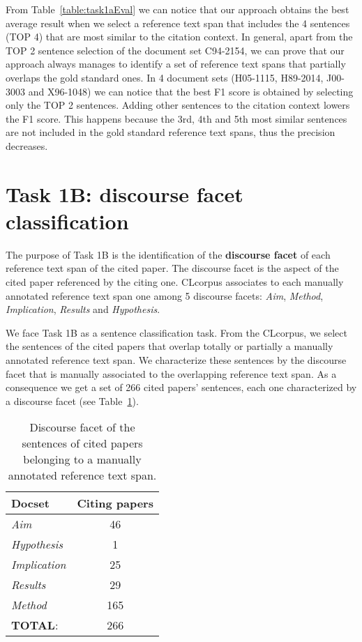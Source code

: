 \documentclass[11pt]{article}
\begin{document}
From Table~\ref{table:task1aEval} we can notice that our approach obtains the best average result when we select a reference text span that includes the 4 sentences (TOP 4) that are most similar to the citation context.
In general, apart from the TOP 2 sentence selection of the document set C94-2154, we can prove that our approach always manages to identify a set of reference text spans that partially overlaps the gold standard ones.
In 4 document sets (H05-1115, H89-2014, J00-3003 and X96-1048) we can notice that the best F1 score is obtained by selecting only the TOP 2 sentences. Adding other sentences to the citation context lowers the F1 score. This happens because the 3rd, 4th and 5th most similar sentences are not included in the gold standard reference text spans, thus the precision decreases. 



\section{Task 1B: discourse facet classification}
\label{sec:task1b}
The purpose of Task 1B is the identification of the \textbf{discourse facet} of each reference text span of the cited paper. The discourse facet is the aspect of the cited paper referenced by the citing one. CLcorpus associates to each manually annotated reference text span one among 5 discourse facets: \textit{Aim}, \textit{Method}, \textit{Implication}, \textit{Results} and \textit{Hypothesis}.

We face Task 1B as a sentence classification task. From the CLcorpus, we select the sentences of the cited papers that overlap totally or partially a manually annotated reference text span. We characterize these sentences by the discourse facet that is manually associated to the overlapping reference text span. As a consequence we get a set of 266 cited papers' sentences, each one characterized by a discourse facet (see Table~\ref{table:task1bSentDistrib}). 
 
\begin{table}[h]\footnotesize
  \begin{center}
  \begin{tabular}{ l | c }
    \hline
    Docset & Citing papers \\ \hline
    \textit{Aim} & 46 \\ \hline
    \textit{Hypothesis} & 1 \\ \hline
    \textit{Implication} & 25 \\ \hline
    \textit{Results} & 29 \\ \hline
    \textit{Method} & 165 \\ \hline
    \textbf{TOTAL}: & 266 \\ \hline
    \hline
  \end{tabular}
  \caption{Discourse facet of the sentences of cited papers belonging to a manually annotated reference text span.}
  \label{table:task1bSentDistrib}
  \end{center}
\end{table}
\end{document}
